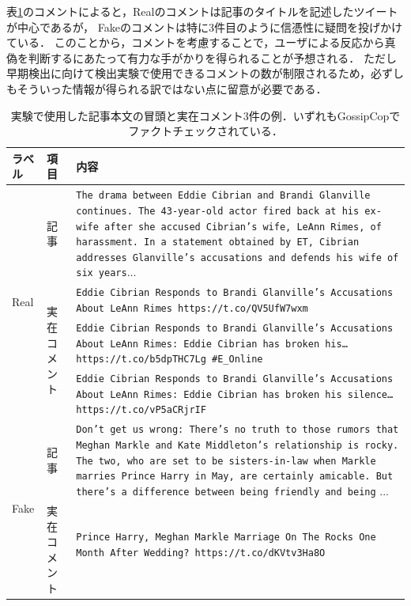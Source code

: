 表\ref{tbl:data_example}のコメントによると，Realのコメントは記事のタイトルを記述したツイートが中心であるが，
Fakeのコメントは特に3件目のように信憑性に疑問を投げかけている．
このことから，コメントを考慮することで，ユーザによる反応から真偽を判断するにあたって有力な手がかりを得られることが予想される．
ただし早期検出に向けて検出実験で使用できるコメントの数が制限されるため，必ずしもそういった情報が得られる訳ではない点に留意が必要である．
\begin{landscape}
\begin{table}[p]
    \centering
    \caption{実験で使用した記事本文の冒頭と実在コメント3件の例．いずれもGossipCopでファクトチェックされている．}
    \label{tbl:data_example}
    \begin{tabularx}{\linewidth}{llX}  \hline
        ラベル & 項目 & 内容 \\ \hline
        \multirow{4}{*}{Real} & 記事                         & \texttt{The drama between Eddie Cibrian and Brandi Glanville continues.  The 43-year-old actor fired back at his ex-wife after she accused Cibrian's wife, LeAnn Rimes, of harassment.  In a statement obtained by ET, Cibrian addresses Glanville's accusations and defends his wife of six years}...\\ \cline{2-3}
                              & \multirow{3}{*}{実在コメント} & \texttt{Eddie Cibrian Responds to Brandi Glanville’s Accusations About LeAnn Rimes https://t.co/QV5UfW7wxm}\\ \cline{3-3}
                              &                             & \texttt{Eddie Cibrian Responds to Brandi Glanville's Accusations About LeAnn Rimes: Eddie Cibrian has broken his… https://t.co/b5dpTHC7Lg \#E\_Online}\\ \cline{3-3}
                              &                             & \texttt{Eddie Cibrian Responds to Brandi Glanville's Accusations About LeAnn Rimes: Eddie Cibrian has broken his silence… https://t.co/vP5aCRjrIF}\\ \hline
        \multirow{4}{*}{Fake} & 記事                         & \texttt{Don’t get us wrong: There’s no truth to those rumors that Meghan Markle and Kate Middleton's relationship is rocky. The two, who are set to be sisters-in-law when Markle marries Prince Harry in May, are certainly amicable. But there’s a difference between being friendly and being} ...\\ \cline{2-3}
                              & \multirow{3}{*}{実在コメント} & \texttt{Prince Harry, Meghan Markle Marriage On The Rocks One Month After Wedding? https://t.co/dKVtv3Ha8O}\\ \cline{3-3}

\end{tabularx}
\end{table}
\end{landscape}
